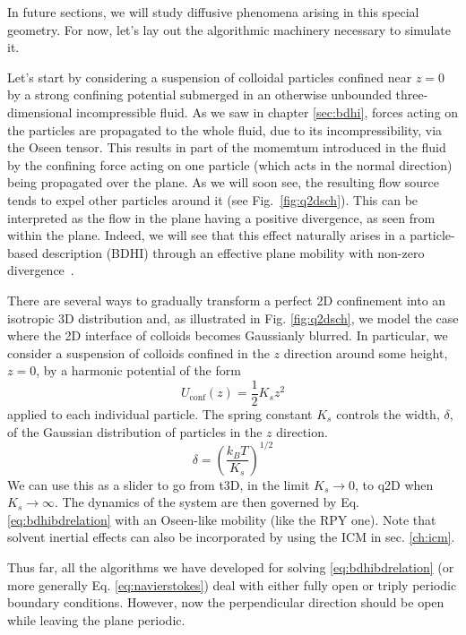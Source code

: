 \documentclass[twoside,openright,titlepage,numbers=noenddot,%
headinclude,footinclude,cleardoublepage=empty,abstract=on,
BCOR=5mm,fontsize=11pt, dvipsnames, paper=b5
]{scrreprt}
\newcommand{\kT}{k_B T}
\newcommand{\half}{\frac{1}{2}}
\begin{document}
In future sections, we will study diffusive phenomena arising in this special geometry. For now, let's lay out the algorithmic machinery necessary to simulate it.

Let's start by considering a suspension of colloidal particles confined near $z=0$ by a strong confining potential submerged in an otherwise unbounded three-dimensional incompressible fluid. As we saw in chapter \ref{sec:bdhi}, forces acting on the particles are propagated to the whole fluid, due to its incompressibility, via the Oseen tensor. This results in part of the momemtum introduced in the fluid by the confining force acting on one particle (which acts in the normal direction) being propagated over the plane. As we will soon see, the resulting flow source tends to expel other particles around it (see Fig.~\ref{fig:q2dsch}). This can be interpreted as the flow in the plane having a positive divergence, as seen from within the plane. Indeed, we will see that this effect naturally arises in a particle-based description (\gls{BDHI}) through an effective plane mobility with non-zero divergence~\cite{Pelaez2017}.

There are several ways to gradually transform a perfect 2D confinement into an isotropic 3D distribution and, as illustrated in Fig. \ref{fig:q2dsch}, we model the case where the 2D interface of colloids becomes Gaussianly blurred. In particular, we consider a suspension of colloids confined in the $z$ direction around some height, $z=0$, by a harmonic potential of the form
\begin{equation}
  \label{eq:q2Dconf}
U_{\text{conf}}(z)=\half K_sz^2
\end{equation}
applied to each individual particle.
The spring constant $K_s$ controls the width, $\delta$, of the Gaussian distribution of particles in the $z$ direction.
\begin{equation}
  \delta = \left(\frac{\kT}{K_s}\right)^{1/2}
\end{equation}
We can use this as a slider to go from t3D, in the limit $K_s\rightarrow 0$, to q2D when $K_s\rightarrow\infty$.
The dynamics of the system are then governed by Eq. \eqref{eq:bdhibdrelation} with an Oseen-like mobility (like the \gls{RPY} one). Note that solvent inertial effects can also be incorporated by using the \gls{ICM} in sec. \ref{ch:icm}.

Thus far, all the algorithms we have developed for solving \eqref{eq:bdhibdrelation} (or more generally Eq. \eqref{eq:navierstokes}) deal with either fully open or triply periodic boundary conditions. However, now the perpendicular direction should be open while leaving the plane periodic.
\end{document}
